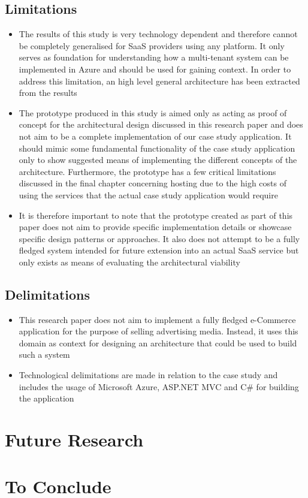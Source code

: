 \subsection{Limitations}
\begin{itemize}
\item The results of this study is very technology dependent and therefore cannot be completely generalised for SaaS providers using any platform. It only serves as foundation for understanding how a multi-tenant system can be implemented in Azure and should be used for gaining context. In order to address this limitation, an high level general architecture has been extracted from the results
\item The prototype produced in this study is aimed only as acting as proof of concept for the architectural design discussed in this research paper and does not aim to be a complete implementation of our case study application. It should mimic some fundamental functionality of the case study application only to show suggested means of implementing the different concepts of the architecture. Furthermore, the prototype has a few critical limitations discussed in the final chapter concerning hosting due to the high costs of using the services that the actual case study application would require
\item It is therefore important to note that the prototype created as part of this paper does not aim to provide specific implementation details or showcase specific design patterns or approaches. It also does not attempt to be a fully fledged system intended for future extension into an actual SaaS service but only exists as means of evaluating the architectural viability
\end{itemize}
\vfill

\subsection{Delimitations}
\begin{itemize}
\item This research paper does not aim to implement a fully fledged e-Commerce application for the purpose of selling advertising media. Instead, it uses this domain as context for designing an architecture that could be used to build such a system
\item Technological delimitations are made in relation to the case study and includes the usage of Microsoft Azure, ASP.NET  MVC and C\# for building the application
\end{itemize}

\section{Future Research}

\section{To Conclude}

\vfill
